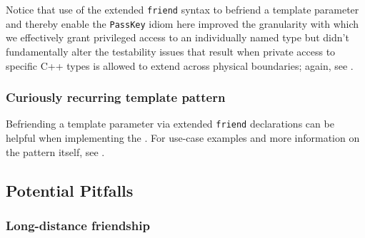 \noindent Notice that use of the extended \lstinline!friend! syntax to befriend a
template parameter and thereby enable the \lstinline!PassKey! idiom here
improved the granularity with which we effectively grant privileged
access to an individually named type but didn't fundamentally alter the
testability issues that result when private access to specific C++
types is allowed to extend across physical boundaries; again, see . 

\subsubsection[Curiously recurring template pattern]{Curiously recurring template pattern}\label{curiously-recurring-template-pattern}

Befriending a template parameter via extended \lstinline!friend!
declarations can be helpful when implementing the . For use-case examples and more
information on the pattern itself, see . 

\subsection[Potential Pitfalls]{Potential Pitfalls}\label{potential-pitfalls-extendedfriend}

\subsubsection[Long-distance friendship]{Long-distance friendship}\label{long-distance-friendship}

